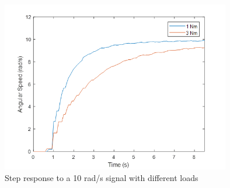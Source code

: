 \begin{figure}[h!p]
\centering
\includegraphics[width=10cm]{Images/plots/plot_9.png} 
\caption[plot9]{Step response to a 10 rad/s signal with different loads}
\label{fig:plot9}
\end{figure}

\clearpage

